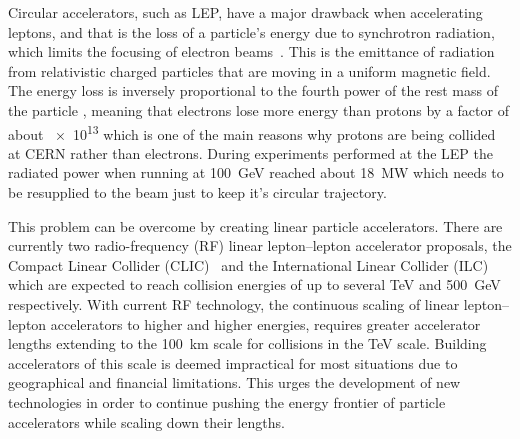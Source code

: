 Circular accelerators, such as LEP, have a major drawback when accelerating
leptons, and that is the loss of a particle's energy due to synchrotron
radiation, which limits the focusing of electron beams~\cite{Oide1988ru}.  This
is the emittance of radiation from relativistic charged particles that are
moving in a uniform magnetic field. The energy loss is inversely proportional to
the fourth power of the rest mass of the particle \cite{sokolov1966synchrotron},
meaning that electrons lose more energy than protons by a factor of about
\num{e13} which is one of the main reasons why protons are being collided at
CERN rather than electrons. During experiments performed at the LEP the radiated
power when running at \SI{100}{\giga\electronvolt} reached about
\SI{18}{\mega\watt} which needs to be resupplied to the beam just to keep it's
circular trajectory.

This problem can be overcome by creating linear particle accelerators. There are
currently two radio-frequency (RF) linear lepton--lepton accelerator proposals,
the Compact Linear Collider (CLIC)~\cite{Linssen2012hp} and the International
Linear Collider (ILC)~\cite{Behnke2013xla} which are expected to reach collision
energies of up to several \si{\tera\electronvolt} and
\SI{500}{\giga\electronvolt} respectively.
With current RF technology, the continuous scaling of linear lepton--lepton
accelerators to higher and higher energies, requires greater accelerator lengths
extending to the \SI{100}{\kilo\meter} scale for collisions in the
\si{\tera\electronvolt} scale. Building accelerators of this scale is deemed
impractical for most situations due to geographical and financial limitations.
This urges the development of new technologies in order to continue pushing the
energy frontier of particle accelerators while scaling down their lengths.


